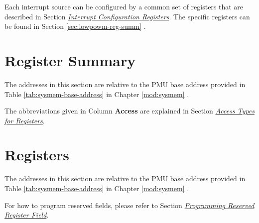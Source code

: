 \documentclass[main\_\_EN.tex]{subfiles}
\begin{document}
Each interrupt source can be configured by a common set of registers that are described in Section \hyperref[interrupt-config-registers]{\textit{Interrupt Configuration Registers}}. The specific registers can be found in Section \ref{sec:lowpowm-reg-summ} \textit{}.

\clearpage
\section{Register Summary}\hypertarget{lowpowm-reg-summ}{}\label{sec:lowpowm-reg-summ}

The addresses in this section are relative to the PMU base address provided in Table \ref{tab:sysmem-base-address} in Chapter \ref{mod:sysmem} \textit{}.

The abbreviations given in Column \textbf{Access} are explained in Section \hyperref[glossary-access-types]{\textit{Access Types for Registers}}.



\clearpage
\section{Registers}

The addresses in this section are relative to the PMU base address provided in Table \ref{tab:sysmem-base-address} in Chapter \ref{mod:sysmem} \textit{}.

For how to program reserved fields, please refer to Section \hyperref[programming-reserved-field]{\textit{Programming Reserved Register Field}}.


\end{document}
